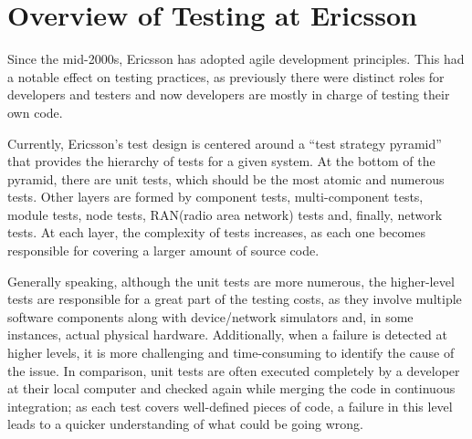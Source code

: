 \section{Overview of Testing at Ericsson}\label{sec:ind_overview}

%

%
%

Since the mid-2000s, Ericsson has adopted agile development principles.
This had a notable effect on testing practices, as previously there were distinct roles for developers and testers and now developers are mostly in charge of testing their own code.

Currently, Ericsson's test design is centered around a ``test strategy pyramid'' that provides the hierarchy of tests for a given system.
At the bottom of the pyramid, there are unit tests, which should be the most atomic and numerous tests.
Other layers are formed by component tests, multi-component tests, module tests, node tests, RAN(radio area network) tests and, finally, network tests.
At each layer, the complexity of tests increases, as each one becomes responsible for covering a larger amount of source code.

Generally speaking, although the unit tests are more numerous, the higher-level tests are responsible for a great part of the testing costs, as they involve multiple software components along with device/network simulators and, in some instances, actual physical hardware.
Additionally, when a failure is detected at higher levels, it is more challenging and time-consuming to identify the cause of the issue.
In comparison, unit tests are often executed completely by a developer at their local computer and checked again while merging the code in continuous integration; as each test covers well-defined pieces of code, a failure in this level leads to a quicker understanding of what could be going wrong.

